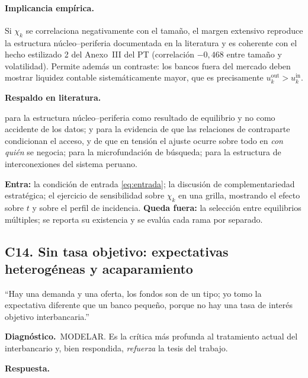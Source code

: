 \documentclass[11pt]{article}
\newcommand{\diag}[1]{\par\noindent\textbf{Diagn\'ostico.}\ #1\par}
\newcommand{\resp}{\par\noindent\textbf{Respuesta.}\par}
\newcommand{\lit}{\par\noindent\textbf{Respaldo en literatura.}\par}
\theoremstyle{definition}
\begin{document}
\paragraph{Implicancia emp\'irica.} Si $\chi_k$ se correlaciona negativamente con
el tama\~no, el margen extensivo reproduce la estructura n\'ucleo--periferia
documentada en la literatura \citep{craigvonpeter2014} y es coherente con el
hecho estilizado 2 del Anexo~III del PT (correlaci\'on $-0{,}468$ entre tama\~no y
volatilidad). Permite adem\'as un contraste: los bancos fuera del mercado deben
mostrar liquidez contable sistem\'aticamente mayor, que es precisamente
$u^{\mathrm{out}}_k>u^{\mathrm{in}}_k$.

\lit
\citet{craigvonpeter2014} para la estructura n\'ucleo--periferia como resultado de
equilibrio y no como accidente de los datos;
\citet{afonso2014trading} y \citet{afonso2011stressed} para la evidencia de que
las relaciones de contraparte condicionan el acceso, y de que en tensi\'on el
ajuste ocurre sobre todo en \emph{con qui\'en} se negocia;
\citet{afonso2015} para la microfundaci\'on de b\'usqueda;
\citet{cuba2020} para la estructura de interconexiones del sistema peruano.

\begin{ie2}
\textbf{Entra:} la condici\'on de entrada \eqref{eq:entrada}; la discusi\'on de
complementariedad estrat\'egica; el ejercicio de sensibilidad sobre $\chi_k$ en
una grilla, mostrando el efecto sobre $t$ y sobre el perfil de incidencia.
\textbf{Queda fuera:} la selecci\'on entre equilibrios m\'ultiples; se reporta su
existencia y se eval\'ua cada rama por separado.
\end{ie2}

\subsection{C14. Sin tasa objetivo: expectativas heterog\'eneas y acaparamiento}
\label{sub:C14}

\begin{jurado}
``Hay una demanda y una oferta, los fondos son de un tipo; yo tomo la expectativa
diferente que un banco peque\~no, porque no hay una tasa de inter\'es objetivo
interbancaria.''
\end{jurado}

\diag{MODELAR. Es la cr\'itica m\'as profunda al tratamiento actual del
interbancario y, bien respondida, \emph{refuerza} la tesis del trabajo.}

\resp
\end{document}
